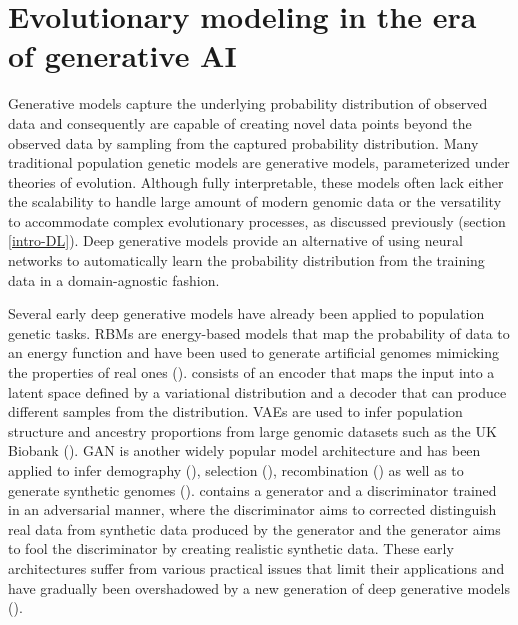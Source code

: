 \section{Evolutionary modeling in the era of generative \ac{AI}} \label{evo-genAI}

Generative models capture the underlying probability distribution of observed data and consequently are capable of creating novel data points beyond the observed data by sampling from the captured probability distribution. Many traditional population genetic models are generative models, parameterized under theories of evolution. Although fully interpretable, these models often lack either the scalability to handle large amount of modern genomic data or the versatility to accommodate complex evolutionary processes, as discussed previously (section \ref{intro-DL}). Deep generative models provide an alternative of using neural networks to automatically learn the probability distribution from the training data in a domain-agnostic fashion.

Several early deep generative models have already been applied to population genetic tasks. \Acp{RBM} are energy-based models that map the probability of data to an energy function and have been used to generate artificial genomes mimicking the properties of real ones (\cite{yelmen2021creating,yelmen2023deep}).  consists of an encoder that maps the input into a latent space defined by a variational distribution and a decoder that can produce different samples from the distribution. \Acp{VAE} are used to infer population structure and ancestry proportions from large genomic datasets such as the UK Biobank (\cite{meisner2022haplotype}). \Acf{GAN} is another widely popular model architecture and has been applied to infer demography (\cite{wang_automatic_2021}), selection (\cite{riley2023interpreting}), recombination (\cite{gower2023inference}) as well as to generate synthetic genomes (\cite{yelmen2021creating,yelmen2023deep}).  contains a generator and a discriminator trained in an adversarial manner, where the discriminator aims to corrected distinguish real data from synthetic data produced by the generator and the generator aims to fool the discriminator by creating realistic synthetic data. These early architectures suffer from various practical issues that limit their applications and have gradually been overshadowed by a new generation of deep generative models (\cite{huang_harnessing_2023}).

